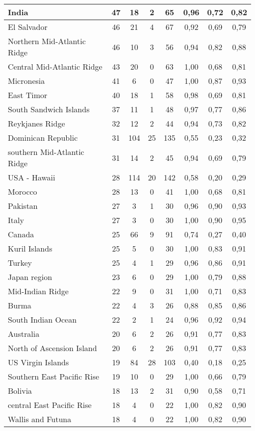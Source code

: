 {\begin{table}[!ht]
\begin{tabular}{|l|ccc|c|ccc|}
India	 & 47 	 & 18 	 & 2 	& 65	 & 0,96 &	0,72 &	0,82 \\ \hline
El Salvador	 & 46 	 & 21 	 & 4 	& 67	 & 0,92 &	0,69 &	0,79 \\ \hline
Northern Mid-Atlantic Ridge	 & 46 	 & 10 	 & 3 	& 56	 & 0,94 &	0,82 &	0,88 \\ \hline
Central Mid-Atlantic Ridge	 & 43 	 & 20 	 & 0   	& 63	 & 1,00 &	0,68 &	0,81 \\ \hline
Micronesia	 & 41 	 & 6 	 & 0   	& 47	 & 1,00 &	0,87 &	0,93 \\ \hline
East Timor	 & 40 	 & 18 	 & 1 	& 58	 & 0,98 &	0,69 &	0,81 \\ \hline
South Sandwich Islands	 & 37 	 & 11 	 & 1 	& 48	 & 0,97 &	0,77 &	0,86 \\ \hline
Reykjanes Ridge	 & 32 	 & 12 	 & 2 	& 44	 & 0,94 &	0,73 &	0,82 \\ \hline
Dominican Republic	 & 31 	 & 104 	 & 25 	& 135	 & 0,55 &	0,23 &	0,32 \\ \hline
southern Mid-Atlantic Ridge	 & 31 	 & 14 	 & 2 	& 45	 & 0,94 &	0,69 &	0,79 \\ \hline
USA - Hawaii	 & 28 	 & 114 	 & 20 	& 142	 & 0,58 &	0,20 &	0,29 \\ \hline
Morocco	 & 28 	 & 13 	 & 0   	& 41	 & 1,00 &	0,68 &	0,81 \\ \hline
Pakistan	 & 27 	 & 3 	 & 1 	& 30	 & 0,96 &	0,90 &	0,93 \\ \hline
Italy	 & 27 	 & 3 	 & 0   	& 30	 & 1,00 &	0,90 &	0,95 \\ \hline
Canada	 & 25 	 & 66 	 & 9 	& 91	 & 0,74 &	0,27 &	0,40 \\ \hline
Kuril Islands	 & 25 	 & 5 	 & 0   	& 30	 & 1,00 &	0,83 &	0,91 \\ \hline
Turkey	 & 25 	 & 4 	 & 1 	& 29	 & 0,96 &	0,86 &	0,91 \\ \hline
Japan region	 & 23 	 & 6 	 & 0   	& 29	 & 1,00 &	0,79 &	0,88 \\ \hline
Mid-Indian Ridge	 & 22 	 & 9 	 & 0   	& 31	 & 1,00 &	0,71 &	0,83 \\ \hline
Burma	 & 22 	 & 4 	 & 3 	& 26	 & 0,88 &	0,85 &	0,86 \\ \hline
South Indian Ocean	 & 22 	 & 2 	 & 1 	& 24	 & 0,96 &	0,92 &	0,94 \\ \hline
Australia	 & 20 	 & 6 	 & 2 	& 26	 & 0,91 &	0,77 &	0,83 \\ \hline
North of Ascension Island	 & 20 	 & 6 	 & 2 	& 26	 & 0,91 &	0,77 &	0,83 \\ \hline
US Virgin Islands	 & 19 	 & 84 	 & 28 	& 103	 & 0,40 &	0,18 &	0,25 \\ \hline
Southern East Pacific Rise	 & 19 	 & 10 	 & 0   	& 29	 & 1,00 &	0,66 &	0,79 \\ \hline
Bolivia	 & 18 	 & 13 	 & 2 	& 31	 & 0,90 &	0,58 &	0,71 \\ \hline
central East Pacific Rise	 & 18 	 & 4 	 & 0   	& 22	 & 1,00 &	0,82 &	0,90 \\ \hline
Wallis and Futuna	 & 18 	 & 4 	 & 0   	& 22	 & 1,00 &	0,82 &	0,90 \\ \hline
   \end{tabular}
\end{table}}

